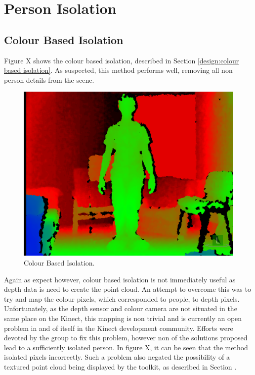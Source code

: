 \section{Person Isolation}
\label{testing:person isolation}

\subsection{Colour Based Isolation}
\label{testing:colour based isolation}
Figure X shows the colour based isolation, described in Section \ref{design:colour based isolation}.
As suspected, this method performs well, removing all non person  details from the scene.\\

\begin{figure}[h]
\begin{center}
\includegraphics[scale=0.4]{./testing/parse1} 
\end{center}
\caption{Colour Based Isolation.}
\label{fig:colour based cut off}
\end{figure} 

Again as expect however, colour based isolation is not immediately useful as depth data is need to create the point cloud. An attempt to overcome this was to try and map the colour pixels, which corresponded to people, to depth pixels.
Unfortunately, as the depth sensor and colour camera are not situated in the same place on the Kinect, this mapping is non trivial and is currently an open problem in and of itself in the Kinect development community.
Efforts were devoted by the group to fix this problem, however non of the solutions proposed lead to a sufficiently isolated person.
In figure X, it can be seen that the method isolated pixels incorrectly. 
Such a problem also negated the possibility of a textured point cloud being displayed by the toolkit, as described in Section .

